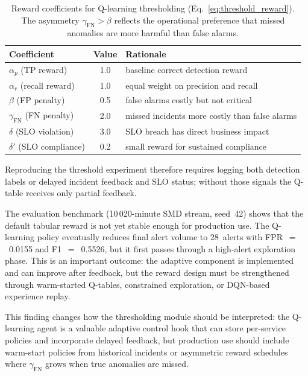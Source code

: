 \begin{table}[H]
    \centering
    \small
    \begin{tabular}{|l|c|l|}
        \hline
        \textbf{Coefficient} & \textbf{Value} & \textbf{Rationale} \\
        \hline
        $\alpha_p$ (TP reward) & 1.0 & baseline correct detection reward \\
        \hline
        $\alpha_r$ (recall reward) & 1.0 & equal weight on precision and recall \\
        \hline
        $\beta$ (FP penalty) & 0.5 & false alarms costly but not critical \\
        \hline
        $\gamma_{\text{FN}}$ (FN penalty) & 2.0 & missed incidents more costly than false alarms \\
        \hline
        $\delta$ (SLO violation) & 3.0 & SLO breach has direct business impact \\
        \hline
        $\delta'$ (SLO compliance) & 0.2 & small reward for sustained compliance \\
        \hline
    \end{tabular}
    \caption{Reward coefficients for Q-learning thresholding
             (Eq.~\ref{eq:threshold_reward}). The asymmetry
             $\gamma_{\text{FN}} > \beta$ reflects the operational
             preference that missed anomalies are more harmful than
             false alarms.}
    \label{tab:reward_coefficients}
\end{table}

Reproducing the threshold experiment therefore
requires logging both detection labels or delayed incident feedback and SLO
status; without those signals the Q-table receives only partial feedback.

The evaluation benchmark (10\,020-minute SMD stream, seed~42) shows that the
default tabular reward is not yet stable enough for production use. The
Q-learning policy eventually reduces final alert volume to 28~alerts with
FPR~$=$~0.0155 and F1~$=$~0.5526, but it first passes through a high-alert
exploration phase. This is an important outcome: the adaptive component is
implemented and can improve after feedback, but the reward design must be
strengthened through warm-started Q-tables, constrained exploration, or
DQN-based experience replay.

This finding changes how the thresholding module should be interpreted: the
Q-learning agent is a valuable adaptive control hook that can store per-service
policies and incorporate delayed feedback, but production use should include
warm-start policies from historical incidents or asymmetric reward schedules
where $\gamma_{\text{FN}}$ grows when true anomalies are missed.

